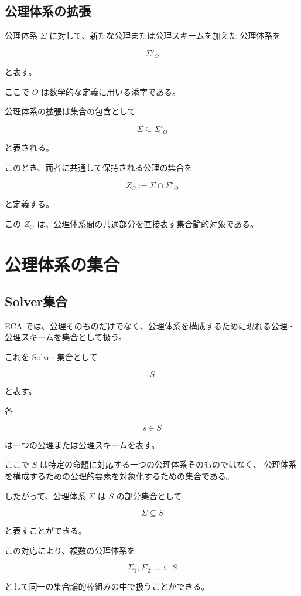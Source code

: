 \documentclass[12pt,a4paper]{article}
\begin{document}
\subsection{公理体系の拡張}

公理体系 $\Sigma$ に対して、新たな公理または公理スキームを加えた
公理体系を

\[
\Sigma'_O
\]

と表す。

ここで $O$ は数学的な定義に用いる添字である。

公理体系の拡張は集合の包含として

\[
\Sigma\subseteq\Sigma'_O
\]

と表される。

このとき、両者に共通して保持される公理の集合を

\[
Z_O:=\Sigma\cap\Sigma'_O
\]

と定義する。

この $Z_O$ は、公理体系間の共通部分を直接表す集合論的対象である。

\section{公理体系の集合}

\subsection{Solver集合}

ECA では、公理そのものだけでなく、公理体系を構成するために現れる公理・公理スキームを集合として扱う。

これを Solver 集合として

\[
S
\]

と表す。

各

\[
s\in S
\]

は一つの公理または公理スキームを表す。

ここで $S$ は特定の命題に対応する一つの公理体系そのものではなく、
公理体系を構成するための公理的要素を対象化するための集合である。

したがって、公理体系 $\Sigma$ は $S$ の部分集合として

\[
\Sigma\subseteq S
\]

と表すことができる。

この対応により、複数の公理体系を

\[
\Sigma_1,\Sigma_2,\ldots\subseteq S
\]

として同一の集合論的枠組みの中で扱うことができる。
\end{document}
